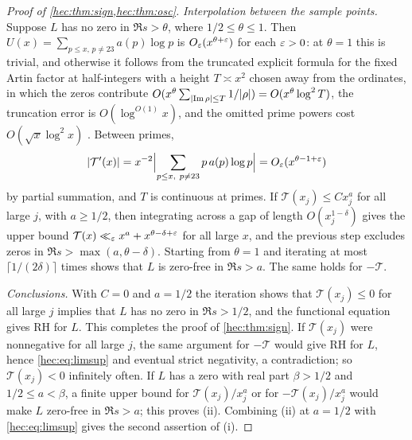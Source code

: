 \begin{proof}[Proof of \cref{hec:thm:sign,hec:thm:osc}]
\emph{Interpolation between the sample points.}
Suppose $L$ has no zero in $\Re s>\theta$, where $1/2\le\theta\le1$. Then
$U(x)=\sum_{p\le x,\,p\ne23}a(p)\log p$ is $O_\varepsilon(x^{\theta+\varepsilon})$ for each $\varepsilon>0$: at $\theta=1$ this
is trivial, and otherwise it follows from the truncated explicit formula for the fixed Artin factor at
half-integers with a height $T\asymp x^2$ chosen away from the ordinates, in which the zeros contribute
$O(x^\theta\sum_{\lvert\operatorname{Im}\rho\rvert\le T}1/\lvert\rho\rvert)=O(x^\theta\log^2T)$, the truncation error is
$O(\log^{O(1)}x)$, and the omitted prime powers cost $O(\sqrt x\log^2x)$
\cite[\S3.4 and Example~3.5.6]{Ng2000Limiting}. Between primes,
\[
 \lvert\mathcal{T}'(x)\rvert=x^{-2}\Bigl\lvert\sum_{p\le x,\ p\ne23}p\,a(p)\log p\Bigr\rvert=O_\varepsilon(x^{\theta-1+\varepsilon})
\]
by partial summation, and $T$ is continuous at primes. If $\mathcal{T}(x_j)\le Cx_j^{a}$ for all large $j$, with
$a\ge1/2$, then integrating across a gap of length $O(x_j^{1-\delta})$ gives the upper bound
$\mathcal{T}(x)\ll_\varepsilon x^{a}+x^{\theta-\delta+\varepsilon}$ for all large $x$, and the previous step excludes zeros in
$\Re s>\max(a,\theta-\delta)$. Starting from $\theta=1$ and iterating at most $\lceil1/(2\delta)\rceil$
times shows that $L$ is zero-free in $\Re s>a$. The same holds for $-\mathcal{T}$.

\emph{Conclusions.}
With $C=0$ and $a=1/2$ the iteration shows that $\mathcal{T}(x_j)\le0$ for all large $j$ implies that $L$ has no
zero in $\Re s>1/2$, and the functional equation gives RH for $L$. This completes the proof of
\cref{hec:thm:sign}. If $\mathcal{T}(x_j)$ were nonnegative for all large $j$, the same argument for $-\mathcal{T}$ would give
RH for $L$, hence \eqref{hec:eq:limsup} and eventual strict negativity, a contradiction; so $\mathcal{T}(x_j)<0$
infinitely often. If $L$ has a zero with real part $\beta>1/2$ and $1/2\le a<\beta$, a finite upper bound
for $\mathcal{T}(x_j)/x_j^{a}$ or for $-\mathcal{T}(x_j)/x_j^{a}$ would make $L$ zero-free in $\Re s>a$; this proves (ii).
Combining (ii) at $a=1/2$ with \eqref{hec:eq:limsup} gives the second assertion of (i).


\end{proof}
